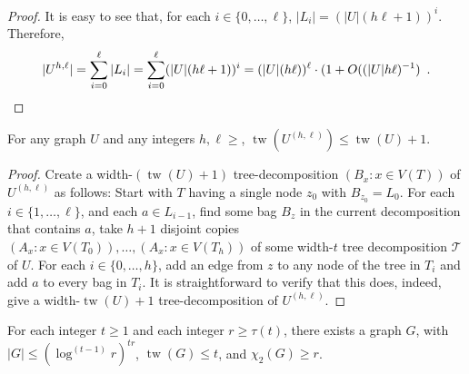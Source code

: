 \documentclass[kpfonts]{patmorin}
\DeclareMathOperator{\tw}{tw}
\newcommand{\trn}{\chi_2}
\theoremstyle{named}
\begin{document}
\begin{proof}
    It is easy to see that, for each $i\in \{0,\ldots,\ell\}$, $|L_i|=(|U|(h\ell+1))^i$.  Therefore,
    \[ |U^{h,\ell}| = \sum_{i=0}^\ell |L_i| = \sum_{i=0}^\ell (|U|(h\ell+1))^i = (|U|(h\ell))^{\ell}\cdot (1+O((|U|h\ell)^{-1}) \enspace . \qedhere
    \]
\end{proof}


\begin{lem}\label{boost-treewidth}
    For any graph $U$ and any integers $h,\ell\ge$, $\tw(U^{(h,\ell)})\le \tw(U)+1$.
\end{lem}

\begin{proof}
  Create a width-$(\tw(U)+1)$ tree-decomposition $(B_x:x\in V(T))$ of $U^{(h,\ell)}$ as follows: Start with $T$ having a single node $z_0$ with $B_{z_0}=L_0$.  For each $i\in\{1,\ldots,\ell\}$, and each $a\in L_{i-1}$, find some bag $B_z$ in the current decomposition that contains $a$, take $h+1$ disjoint copies $(A_x:x\in V(T_0)),\ldots,(A_x:x\in V(T_h))$ of some width-$t$ tree decomposition $\mathcal{T}$ of $U$.  For each $i\in\{0,\ldots,h\}$, add an edge from $z$ to any node of the tree in $T_i$ and add $a$ to every bag in $T_i$.  It is straightforward to verify that this does, indeed, give a width-$\tw(U)+1$ tree-decomposition of $U^{(h,\ell)}$.
\end{proof}


\begin{lem}\label{treewidth-lower-bound}
    For each integer $t\ge 1$ and each integer $r\ge \tau(t)$, there exists a graph $G$, with $|G|\le (\log^{(t-1)}r)^{t r}$, $\tw(G)\le t$, and $\trn(G)\ge r$.
\end{lem}
\end{document}
